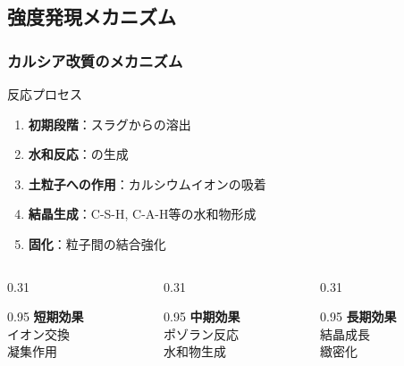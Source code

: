 \documentclass[unicode, 9pt, aspectratio=43]{beamer}
\begin{document}
\begin{refsection}
  \section{強度発現メカニズム}

  \begin{frame}
    \frametitle{カルシア改質のメカニズム}
    \begin{center}
      \begin{minipage}{0.85\linewidth}
        \begin{block}{反応プロセス}
          \begin{enumerate}
            \item \textbf{初期段階}：スラグからの溶出
            \item \textbf{水和反応}：の生成
            \item \textbf{土粒子への作用}：カルシウムイオンの吸着
            \item \textbf{結晶生成}：C-S-H, C-A-H等の水和物形成
            \item \textbf{固化}：粒子間の結合強化
          \end{enumerate}
        \end{block}
      \end{minipage}
    \end{center}

    \vspace{0.5em}

    \begin{columns}
      \begin{column}{0.31\linewidth}
        \begin{roundbox}[blue!15]{0.95\linewidth}
          \centering
          \scriptsize
          \textbf{短期効果}\\
          イオン交換\\
          凝集作用
        \end{roundbox}
      \end{column}
      \begin{column}{0.31\linewidth}
        \begin{roundbox}[green!15]{0.95\linewidth}
          \centering
          \scriptsize
          \textbf{中期効果}\\
          ポゾラン反応\\
          水和物生成
        \end{roundbox}
      \end{column}
      \begin{column}{0.31\linewidth}
        \begin{roundbox}[red!15]{0.95\linewidth}
          \centering
          \scriptsize
          \textbf{長期効果}\\
          結晶成長\\
          緻密化
        \end{roundbox}
      \end{column}
    \end{columns}
  \end{frame}


\end{refsection}
\end{document}
